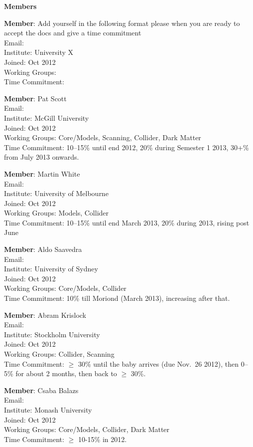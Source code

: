 

\centerline{\textbf{Members}}\bigskip 

\textbf{Member}: Add yourself in the following format please when you are ready to accept the docs and give a time commitment\\
Email: \\
Institute: University X\\
Joined: Oct 2012\\
Working Groups:\\
Time Commitment: 

\textbf{Member}: Pat Scott\\
Email: \\
Institute: McGill University\\
Joined: Oct 2012\\
Working Groups: Core/Models, Scanning, Collider, Dark Matter \\
Time Commitment: 10--15\% until end 2012, 20\% during Semester 1 2013, 30+\% from July 2013 onwards.

\textbf{Member}: Martin White\\
Email: \\
Institute: University of Melbourne\\
Joined: Oct 2012\\
Working Groups: Models, Collider\\
Time Commitment: 10–15\% until end March 2013, 20\% during 2013, rising post June

\textbf{Member}: Aldo Saavedra\\
Email: \\
Institute: University of Sydney\\
Joined: Oct 2012\\
Working Groups: Core/Models, Collider\\
Time Commitment: 10\% till Moriond (March 2013), increasing after that. 

\textbf{Member}: Abram Krislock\\
Email: \\
Institute: Stockholm University\\
Joined: Oct 2012\\
Working Groups: Collider, Scanning\\
Time Commitment: $\ge$ 30\% until the baby arrives (due Nov.\ 26 2012), then 0--5\% for about 2 months, then back to $\ge$ 30\%. 

\textbf{Member}: Csaba Balazs\\
Email: \\
Institute: Monash University\\
Joined: Oct 2012\\
Working Groups: Core/Models, Collider, Dark Matter\\
Time Commitment: $\ge$ 10-15\% in 2012. 


